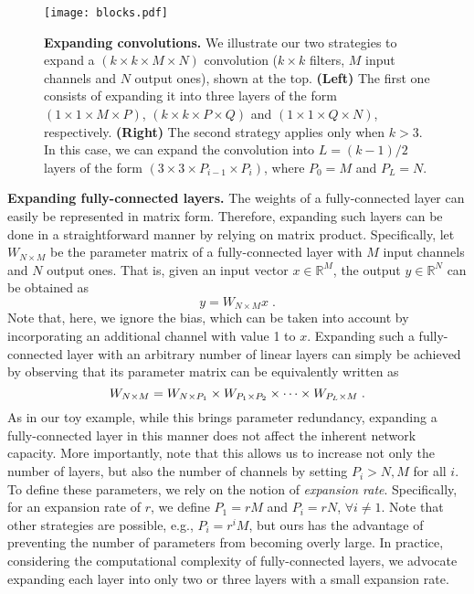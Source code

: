 \documentclass[10pt,twocolumn,letterpaper]{article}
\begin{document}
\begin{figure*}[t]
	\centering
	\texttt{[image: blocks.pdf]}
	\caption{{\bf Expanding convolutions.} We illustrate our two strategies to expand a $(k \times k \times M \times N)$ convolution ($k\times k$ filters, $M$ input channels and $N$ output ones), shown at the top. {\bf (Left)} The first one consists of expanding it into three layers of the form $(1 \times 1 \times M \times P)$, $(k \times k \times P \times Q)$ and $(1 \times 1 \times Q \times N)$, respectively. 
	{\bf (Right)} The second strategy applies only when $k>3$. In this case, we can expand the convolution into $L = (k-1)/2$ layers of the form $(3 \times 3 \times P_{i-1} \times P_i)$, where $P_0 = M$ and $P_L = N$. 
	}
	\label{fig:blocks}
\end{figure*}\vspace{0.2cm}\noindent\textbf{Expanding fully-connected layers.}
The weights of a fully-connected layer can easily be represented in matrix form. Therefore, expanding such layers can be done in a straightforward manner by relying on matrix product. Specifically, let $W_{N\times M}$ be the parameter matrix of a fully-connected layer with $M$ input channels and $N$ output ones. That is, given an input vector $x\in \mathbb{R}^M$, the output $y\in \mathbb{R}^N$ can be obtained as
\begin{equation}
    y = W_{N\times M} x\;.
\end{equation}
Note that, here, we ignore the bias, which can be taken into account by incorporating an additional channel with value 1 to $x$. Expanding such a fully-connected layer with an arbitrary number of linear layers can simply be achieved by observing that its parameter matrix can be equivalently written as
\begin{equation}
    \centering
    W_{N \times M} = W_{N \times P_{1}} \times W_{P_{1} \times P_{2}} \times \cdots \times W_{P_{L} \times M}\;.
\end{equation}
As in our toy example, while this brings parameter redundancy, expanding a fully-connected layer in this manner does not affect the inherent network capacity.
More importantly, note that this allows us to increase not only the number of layers, but also the number of channels by setting $P_i>N,M$ for all $i$. To define these parameters, we rely on the notion of {\it expansion rate}. Specifically, for an expansion rate of $r$, we define $P_1 = rM$ and $P_i=rN$, $\forall i \neq 1$. Note that other strategies are possible, e.g., $P_i = r^iM$, but ours has the advantage of preventing the number of parameters from becoming overly large.
In practice, considering the computational complexity of fully-connected layers, we advocate expanding each layer into only two or three layers with a small expansion rate.
\end{document}
